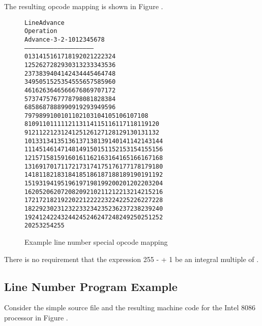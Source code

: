 The resulting opcode mapping is shown in
Figure .

\begin{figure}[ht]
\begin{alltt}
                        Line Advance
   Operation  
     Advance    -3  -2  -1   0   1   2   3   4   5   6   7   8
   ---------   -----------------------------------------------
           0    13  14  15  16  17  18  19  20  21  22  23  24
           1    25  26  27  28  29  30  31  32  33  34  35  36
           2    37  38  39  40  41  42  43  44  45  46  47  48
           3    49  50  51  52  53  54  55  56  57  58  59  60
           4    61  62  63  64  65  66  67  68  69  70  71  72
           5    73  74  75  76  77  78  79  80  81  82  83  84
           6    85  86  87  88  89  90  91  92  93  94  95  96
           7    97  98  99 100 101 102 103 104 105 106 107 108
           8   109 110 111 112 113 114 115 116 117 118 119 120
           9   121 122 123 124 125 126 127 128 129 130 131 132
          10   133 134 135 136 137 138 139 140 141 142 143 144
          11   145 146 147 148 149 150 151 152 153 154 155 156
          12   157 158 159 160 161 162 163 164 165 166 167 168
          13   169 170 171 172 173 174 175 176 177 178 179 180
          14   181 182 183 184 185 186 187 188 189 190 191 192
          15   193 194 195 196 197 198 199 200 201 202 203 204
          16   205 206 207 208 209 210 211 212 213 214 215 216
          17   217 218 219 220 221 222 223 224 225 226 227 228 
          18   229 230 231 232 233 234 235 236 237 238 239 240 
          19   241 242 243 244 245 246 247 248 249 250 251 252
          20   253 254 255
          
\end{alltt}
\caption{Example line number special opcode mapping}
\label{fig:examplelinenumberspecialopcodemapping}
\end{figure}

There is no requirement that the expression 
255 -  + 1 be an integral multiple of
.


\clearpage
\subsection{Line Number Program Example}
\label{app:linenumberprogramexample}

Consider the simple source file and the resulting machine
code for the Intel 8086 processor in 
Figure .

